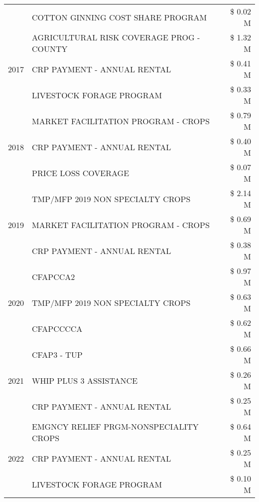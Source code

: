 \begin{tabular}{llr}
 & COTTON GINNING COST SHARE PROGRAM & \$ 0.02 M \\
\cline{1-3}
\multirow[t]{3}{*}{2017} & AGRICULTURAL RISK COVERAGE PROG - COUNTY & \$ 1.32 M \\
 & CRP PAYMENT - ANNUAL RENTAL & \$ 0.41 M \\
 & LIVESTOCK FORAGE PROGRAM & \$ 0.33 M \\
\cline{1-3}
\multirow[t]{3}{*}{2018} & MARKET FACILITATION PROGRAM - CROPS & \$ 0.79 M \\
 & CRP PAYMENT - ANNUAL RENTAL & \$ 0.40 M \\
 & PRICE LOSS COVERAGE & \$ 0.07 M \\
\cline{1-3}
\multirow[t]{3}{*}{2019} & TMP/MFP 2019 NON SPECIALTY CROPS & \$ 2.14 M \\
 & MARKET FACILITATION PROGRAM - CROPS & \$ 0.69 M \\
 & CRP PAYMENT - ANNUAL RENTAL & \$ 0.38 M \\
\cline{1-3}
\multirow[t]{3}{*}{2020} & CFAPCCA2 & \$ 0.97 M \\
 & TMP/MFP 2019 NON SPECIALTY CROPS & \$ 0.63 M \\
 & CFAPCCCCA & \$ 0.62 M \\
\cline{1-3}
\multirow[t]{3}{*}{2021} & CFAP3 - TUP & \$ 0.66 M \\
 & WHIP PLUS 3 ASSISTANCE & \$ 0.26 M \\
 & CRP PAYMENT - ANNUAL RENTAL & \$ 0.25 M \\
\cline{1-3}
\multirow[t]{3}{*}{2022} & EMGNCY RELIEF PRGM-NONSPECIALITY CROPS & \$ 0.64 M \\
 & CRP PAYMENT - ANNUAL RENTAL & \$ 0.25 M \\
 & LIVESTOCK FORAGE PROGRAM & \$ 0.10 M \\
\cline{1-3}
\bottomrule
\end{tabular}

